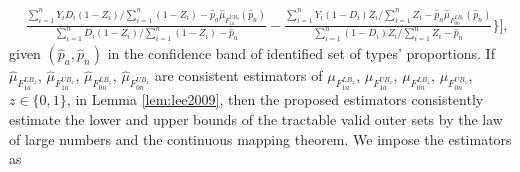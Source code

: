 \documentclass[12pt]{article}
\theoremstyle{plain}
\theoremstyle{definition}
\theoremstyle{remark}
\begin{document}
\begin{equation*}
\begin{aligned}
         & \frac{\sum_{i=1}^{n}Y_i D_i (1-Z_i) / \sum_{i=1}^{n} (1-Z_i) - \hat{p}_a \hat{\mu}_{F_{1a}^{UB_0}}(\hat{p}_a)}{\sum_{i=1}^{n} D_i (1-Z_i) / \sum_{i=1}^{n} (1-Z_i)-\hat{p}_a}-\frac{\sum_{i=1}^{n} Y_i (1-D_i) Z_i / \sum_{i=1}^{n}Z_i-\hat{p}_n \hat{\mu}_{F_{0n}^{LB_0}}\left(\hat{p}_n\right)}{\sum_{i=1}^{n} (1-D_i) Z_i/ \sum_{i=1}^{n} Z_i - \hat{p}_n} \Bigg\} \Bigg],
    \end{aligned}
\end{equation*}
given $(\hat{p}_a, \hat{p}_n)$ in the confidence band of identified set of types' proportions. If $ \hat{\mu}_{F_{1a}^{LB_z}}$, $\hat{\mu}_{F_{1a}^{UB_z}}$, $ \hat{\mu}_{F_{0n}^{LB_z}}$, $\hat{\mu}_{F_{0n}^{UB_z}}$ are consistent estimators of $\mu_{F_{1a}^{LB_z}}$, $\mu_{F_{1a}^{UB_z}}$, $\mu_{F_{0n}^{LB_z}}$, $\mu_{F_{0n}^{UB_z}}$, $z \in \{0,1\}$, in Lemma \ref{lem:lee2009}, then the proposed estimators consistently estimate the lower and upper bounds of the tractable valid outer sets by the law of large numbers and the continuous mapping theorem. We impose the estimators as
\end{document}
